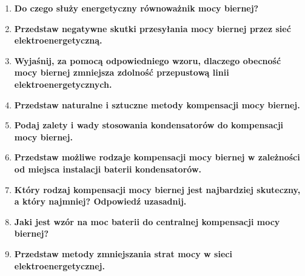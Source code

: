 \documentclass[12pt]{article}
\newcommand{\pytanie}[1]{\item \textbf{#1}}
\begin{document}
\begin{enumerate}
    \pytanie{Do czego służy energetyczny równoważnik mocy biernej?}

    \pytanie{Przedstaw negatywne skutki przesyłania mocy biernej przez sieć 
    elektroenergetyczną.}

    \pytanie{Wyjaśnij, za pomocą odpowiedniego wzoru, dlaczego obecność mocy biernej 
    zmniejsza zdolność przepustową linii elektroenergetycznych.}

    \pytanie{Przedstaw naturalne i sztuczne metody kompensacji mocy biernej.}

    \pytanie{Podaj zalety i wady stosowania kondensatorów do kompensacji mocy biernej.}

    \pytanie{Przedstaw możliwe rodzaje kompensacji mocy biernej w zależności od miejsca 
    instalacji baterii kondensatorów.}

    \pytanie{Który rodzaj kompensacji mocy biernej jest najbardziej skuteczny, a który 
    najmniej? Odpowiedź uzasadnij.}

    \pytanie{Jaki jest wzór na moc baterii do centralnej kompensacji mocy biernej?}

    \pytanie{Przedstaw metody zmniejszania strat mocy w sieci elektroenergetycznej.}

\end{enumerate}
\end{document}
